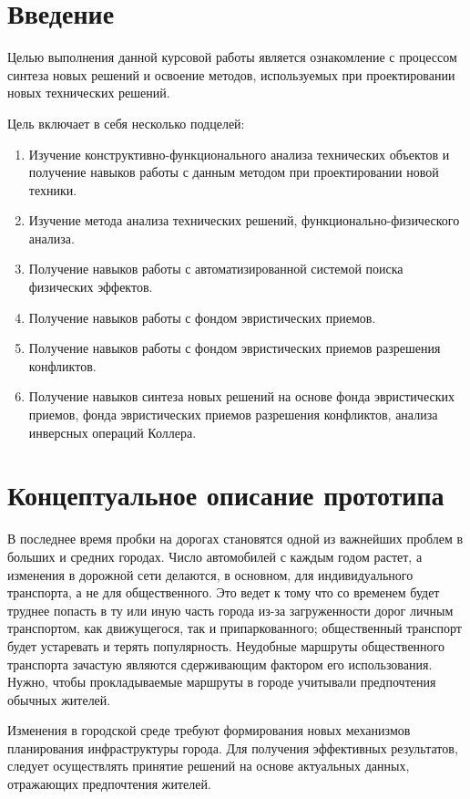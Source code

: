 \chapter{Введение}
Целью выполнения данной курсовой работы является ознакомление с процессом
синтеза новых решений и освоение методов, используемых при проектировании новых
технических решений.

Цель включает в себя несколько подцелей:
\begin{enumerate}
  \item Изучение конструктивно-функционального анализа технических объектов и
    получение навыков работы с данным методом при проектировании новой техники.
  \item Изучение метода анализа технических решений, функционально-физи\-ческого
    анализа. 
  \item Получение навыков работы с автоматизированной системой поиска
    физических эффектов.
  \item Получение навыков работы с фондом эвристических приемов.
  \item Получение навыков работы с фондом эвристических приемов разрешения
    конфликтов.
  \item Получение навыков синтеза новых решений на основе фонда эвристических
    приемов, фонда эвристических приемов разрешения конфликтов, анализа
    инверсных операций Коллера.
\end{enumerate}

\chapter{Концептуальное описание прототипа}
В последнее время пробки на дорогах становятся одной из важнейших проблем в
больших и средних городах. Число автомобилей с каждым годом растет, а изменения
в дорожной сети делаются, в основном, для индивидуального транспорта, а не
для общественного. Это ведет к тому что со временем будет труднее попасть в ту
или иную часть города из-за загруженности дорог личным транспортом, как
движущегося, так и припаркованного; общественный транспорт будет устаревать и
терять популярность. Неудобные маршруты общественного транспорта зачастую
являются сдерживающим фактором его использования. Нужно, чтобы прокладываемые
маршруты в городе учитывали предпочтения обычных жителей. 

Изменения в городской среде требуют формирования новых механизмов планирования
инфраструктуры города. Для получения эффективных результатов, следует
осуществлять принятие решений на основе актуальных данных, отражающих
предпочтения жителей.


